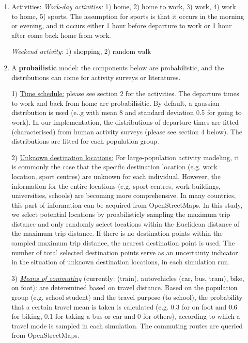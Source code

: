 \documentclass[]{article}
\begin{document}
\begin{enumerate}
\def\labelenumi{\arabic{enumi}.}
\item
  Activities:
  \emph{Work-day activities:} 1) home, 2) home to work, 3) work, 4) work
  to home, 5) sports. The assumption for sports is that it occurs in the
  morning or evening, and it occurs either 1 hour before departure to
  work or 1 hour after come back home from work.

  \emph{Weekend activity}: 1) shopping, 2) random walk 
\item
  A \textbf{probailistic} model: the components below are probabilistic,
  and the distributions can come for activity surveys or literatures.

  1) \underline{Time schedule:} please see section 2 for the activities.
  The departure times to work and back from home are probabilisitic. By
  default, a gaussian distribution is used (e..g with mean 8 and
  standard deviation 0.5 for going to work). In our implementation, the
  distributions of departure times are fitted (characterised) from human
  activity surveys (please see section 4 below). The distributions are
  fitted for each population group.

  2) \underline{Unknown destination locations:} For large-population
  activity modeling, it is commonly the case that the specific
  destination location (e.g. work location, sport centres) are unknown
  for each individual. However, the information for the entire locations
  (e.g. sport centres, work buildings, universities, schools) are
  becoming more comprehensive. In many countries, this part of
  information can be acquired from OpenStreetMaps. In this study, we
  select potential locations by proabilisticly sampling the maximum trip
  distance and only randomly select locations within the Euclidean
  distance of the maximum trip distance. If there is no destination
  points within the sampled maximum trip distance, the nearest
  destination point is used. The number of total selected destination
  points serve as an uncertainty indicator in the situation of unknown
  destination locations, in each simulation run.

  3) \emph{\underline{Means of commuting}} (currently: (train),
  autovehicles (car, bus, tram), bike, on foot): are deteremined based
  on travel distance. Based on the population group (e.g. school
  student) and the travel purpose (to school), the probability that a
  certain travel mean is taken is calculated (e.g. 0.3 for on foot and
  0.6 for biking, 0.1 for taking a bus or car and 0 for others),
  according to which a travel mode is sampled in each simulation. The
  commuting routes are queried from OpenStreetMaps.


\end{enumerate}
\end{document}
